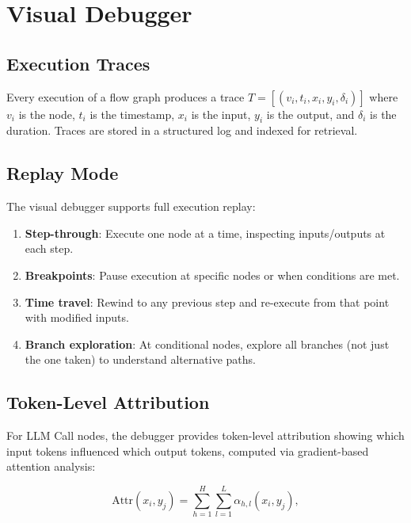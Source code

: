 \section{Visual Debugger}

\label{sec:debugger}

\subsection{Execution Traces}

Every execution of a flow graph produces a trace $T = [(v_i, t_i, x_i, y_i, \delta_i)]$ where $v_i$ is the node, $t_i$ is the timestamp, $x_i$ is the input, $y_i$ is the output, and $\delta_i$ is the duration. Traces are stored in a structured log and indexed for retrieval.

\subsection{Replay Mode}

The visual debugger supports full execution replay:

\begin{enumerate}[leftmargin=1.4em]
    \item \textbf{Step-through}: Execute one node at a time, inspecting inputs/outputs at each step.
    \item \textbf{Breakpoints}: Pause execution at specific nodes or when conditions are met.
    \item \textbf{Time travel}: Rewind to any previous step and re-execute from that point with modified inputs.
    \item \textbf{Branch exploration}: At conditional nodes, explore all branches (not just the one taken) to understand alternative paths.
\end{enumerate}

\subsection{Token-Level Attribution}

For LLM Call nodes, the debugger provides token-level attribution showing which input tokens influenced which output tokens, computed via gradient-based attention analysis:

\begin{equation}
\text{Attr}(x_i, y_j) = \sum_{h=1}^H \sum_{l=1}^L \alpha_{h,l}(x_i, y_j),
\end{equation}


